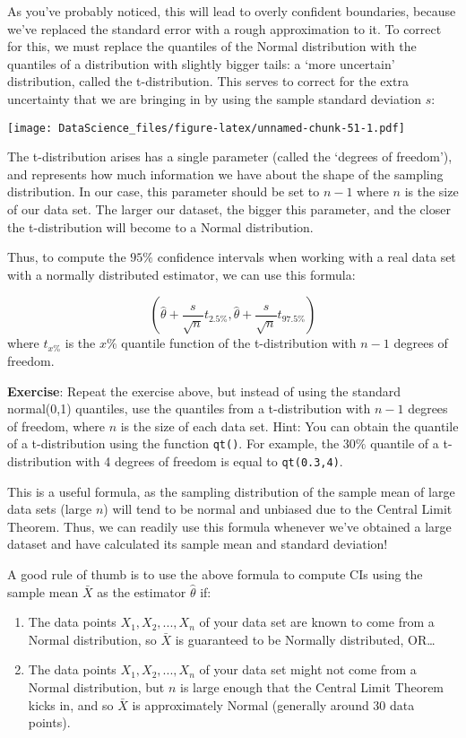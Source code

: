 \documentclass[
]{book}
\begin{document}
As you've probably noticed, this will lead to overly confident boundaries, because we've replaced the standard error with a rough approximation to it. To correct for this, we must replace the quantiles of the Normal distribution with the quantiles of a distribution with slightly bigger tails: a `more uncertain' distribution, called the t-distribution. This serves to correct for the extra uncertainty that we are bringing in by using the sample standard deviation \(s\):

\texttt{[image: DataScience\_files/figure-latex/unnamed-chunk-51-1.pdf]}

The t-distribution arises has a single parameter (called the `degrees of freedom'), and represents how much information we have about the shape of the sampling distribution. In our case, this parameter should be set to \(n-1\) where \(n\) is the size of our data set. The larger our dataset, the bigger this parameter, and the closer the t-distribution will become to a Normal distribution.

Thus, to compute the \(95\%\) confidence intervals when working with a real data set with a normally distributed estimator, we can use this formula:

\[(\hat{\theta} + \frac{s}{\sqrt{n}}t_{2.5\%}, \hat{\theta} + \frac{s}{\sqrt{n}}t_{97.5\%})\]
where \(t_{x\%}\) is the \(x\%\) quantile function of the t-distribution with \(n-1\) degrees of freedom.

\textbf{Exercise}: Repeat the exercise above, but instead of using the standard normal(0,1) quantiles, use the quantiles from a t-distribution with \(n-1\) degrees of freedom, where \(n\) is the size of each data set. Hint: You can obtain the quantile of a t-distribution using the function \texttt{qt()}. For example, the \(30\%\) quantile of a t-distribution with 4 degrees of freedom is equal to \texttt{qt(0.3,4)}.

This is a useful formula, as the sampling distribution of the sample mean of large data sets (large \(n\)) will tend to be normal and unbiased due to the Central Limit Theorem. Thus, we can readily use this formula whenever we've obtained a large dataset and have calculated its sample mean and standard deviation!

A good rule of thumb is to use the above formula to compute CIs using the sample mean \(\bar{X}\) as the estimator \(\hat{\theta}\) if:

\begin{enumerate}
\def\labelenumi{\arabic{enumi}.}
\item
  The data points \(X_1, X_2, ..., X_n\) of your data set are known to come from a Normal distribution, so \(\bar{X}\) is guaranteed to be Normally distributed, OR\ldots{}
\item
  The data points \(X_1, X_2, ..., X_n\) of your data set might not come from a Normal distribution, but \(n\) is large enough that the Central Limit Theorem kicks in, and so \(\bar{X}\) is approximately Normal (generally around 30 data points).
\end{enumerate}
\end{document}
